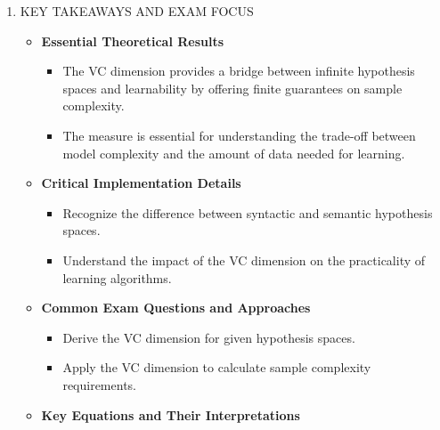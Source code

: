 \documentclass[
  12pt,
]{report}
\providecommand{\tightlist}{%
  \setlength{\itemsep}{0pt}\setlength{\parskip}{0pt}}
\begin{document}
\begin{enumerate}
\begin{itemize}
    \begin{itemize}
    \tightlist
    \item
      The VC dimension is 3 for linear separators in two dimensions, reflecting the geometric intuition that three points can be shattered, but four cannot in a plane due to the XOR-like configuration.
    \end{itemize}
  \item
    \textbf{Convex Polygons}

    \begin{itemize}
    \tightlist
    \item
      Convex polygons in 2D can have an unbounded VC dimension due to the potential for infinitely many vertices, each acting as a parameter.
    \end{itemize}
  \end{itemize}
\item
  KEY TAKEAWAYS AND EXAM FOCUS

  \begin{itemize}
  \tightlist
  \item
    \textbf{Essential Theoretical Results}

    \begin{itemize}
    \tightlist
    \item
      The VC dimension provides a bridge between infinite hypothesis spaces and learnability by offering finite guarantees on sample complexity.
    \item
      The measure is essential for understanding the trade-off between model complexity and the amount of data needed for learning.
    \end{itemize}
  \item
    \textbf{Critical Implementation Details}

    \begin{itemize}
    \tightlist
    \item
      Recognize the difference between syntactic and semantic hypothesis spaces.
    \item
      Understand the impact of the VC dimension on the practicality of learning algorithms.
    \end{itemize}
  \item
    \textbf{Common Exam Questions and Approaches}

    \begin{itemize}
    \tightlist
    \item
      Derive the VC dimension for given hypothesis spaces.
    \item
      Apply the VC dimension to calculate sample complexity requirements.
    \end{itemize}
  \item
    \textbf{Key Equations and Their Interpretations}


\end{itemize}
\end{enumerate}
\end{document}
